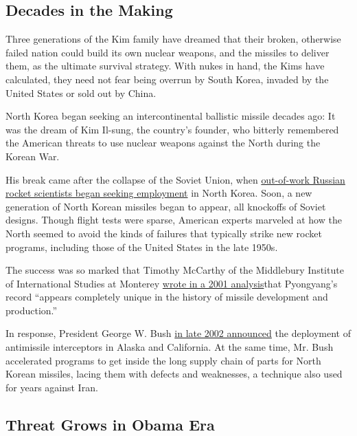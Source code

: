 \hypertarget{decades-in-the-making}{%
\subsection{Decades in the Making}\label{decades-in-the-making}}

Three generations of the Kim family have dreamed that their broken,
otherwise failed nation could build its own nuclear weapons, and the
missiles to deliver them, as the ultimate survival strategy. With nukes
in hand, the Kims have calculated, they need not fear being overrun by
South Korea, invaded by the United States or sold out by China.

North Korea began seeking an intercontinental ballistic missile decades
ago: It was the dream of Kim Il-sung, the country's founder, who
bitterly remembered the American threats to use nuclear weapons against
the North during the Korean War.

His break came after the collapse of the Soviet Union, when
\href{https://www.nytimes3xbfgragh.onion/2016/09/10/science/north-korea-nuclear-weapons.html}{out-of-work
Russian rocket scientists began seeking employment} in North Korea.
Soon, a new generation of North Korean missiles began to appear, all
knockoffs of Soviet designs. Though flight tests were sparse, American
experts marveled at how the North seemed to avoid the kinds of failures
that typically strike new rocket programs, including those of the United
States in the late 1950s.

The success was so marked that Timothy McCarthy of the Middlebury
Institute of International Studies at Monterey
\href{http://calhoun.nps.edu/bitstream/handle/10945/40268/inc_barletta_op6.pdf?sequence=1\&isAllowed=y}{wrote
in a 2001 analysis}that Pyongyang's record ``appears completely unique
in the history of missile development and production.''

In response, President George W. Bush
\href{http://www.nytimes3xbfgragh.onion/2002/12/18/world/threats-responses-defense-antimissile-system-limited-form-ordered-bush.html}{in
late 2002 announced} the deployment of antimissile interceptors in
Alaska and California. At the same time, Mr. Bush accelerated programs
to get inside the long supply chain of parts for North Korean missiles,
lacing them with defects and weaknesses, a technique also used for years
against Iran.

\hypertarget{threat-grows-in-obama-era}{%
\subsection{Threat Grows in Obama Era}\label{threat-grows-in-obama-era}}

